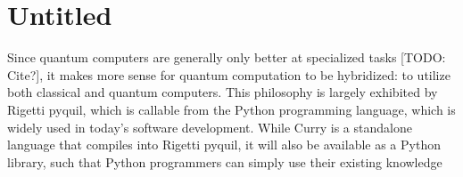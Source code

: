\documentclass[journal]{IEEEtran}
\begin{document}
% 
% 
% 
% 

\section{Untitled}

Since quantum computers are generally only better at specialized tasks [TODO: Cite?], it makes more sense for quantum computation to be hybridized: to utilize both classical and quantum computers.
This philosophy is largely exhibited by Rigetti pyquil, which is callable from the Python programming language, which is widely used in today's software development. 
While Curry is a standalone language that compiles into Rigetti pyquil, it will also be available as a Python library, such that Python programmers can simply use their existing knowledge
\end{document}
